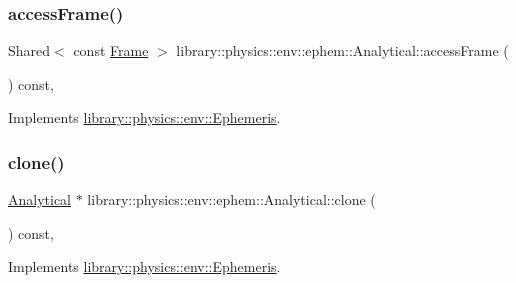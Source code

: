 \subsubsection{\texorpdfstring{access\+Frame()}{accessFrame()}}
{\footnotesize\ttfamily Shared$<$ const \hyperlink{classlibrary_1_1physics_1_1coord_1_1_frame}{Frame} $>$ library\+::physics\+::env\+::ephem\+::\+Analytical\+::access\+Frame (\begin{DoxyParamCaption}{ }\end{DoxyParamCaption}) const\hspace{0.3cm}{\ttfamily [override]}, {\ttfamily [virtual]}}



Implements \hyperlink{classlibrary_1_1physics_1_1env_1_1_ephemeris_ac832f493239ace4d53c1c5130c1dad31}{library\+::physics\+::env\+::\+Ephemeris}.

\mbox{\label{classlibrary_1_1physics_1_1env_1_1ephem_1_1_analytical_acd51ca99177b1433b6623829ae003bec}} 
\subsubsection{\texorpdfstring{clone()}{clone()}}
{\footnotesize\ttfamily \hyperlink{classlibrary_1_1physics_1_1env_1_1ephem_1_1_analytical}{Analytical} $\ast$ library\+::physics\+::env\+::ephem\+::\+Analytical\+::clone (\begin{DoxyParamCaption}{ }\end{DoxyParamCaption}) const\hspace{0.3cm}{\ttfamily [override]}, {\ttfamily [virtual]}}



Implements \hyperlink{classlibrary_1_1physics_1_1env_1_1_ephemeris_a7ddecd88d91f79ff204100eb9607b591}{library\+::physics\+::env\+::\+Ephemeris}.

\mbox{\label{classlibrary_1_1physics_1_1env_1_1ephem_1_1_analytical_a0c0fe5d8326ba439bb0b51e7536ab0fd}} 
